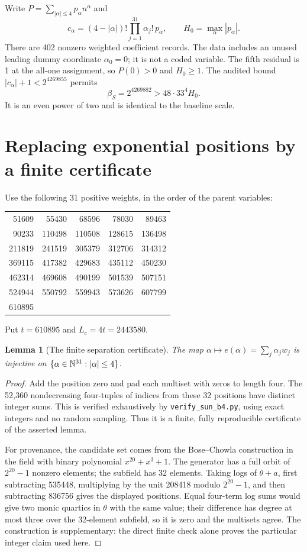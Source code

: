 \documentclass[11pt]{article}
\newtheorem{lemma}[theorem]{Lemma}
\begin{document}
Write $P=\sum_{|\alpha|\le4}p_\alpha n^\alpha$ and
\[
 c_\alpha=(4-|\alpha|)!\prod_{j=1}^{31}\alpha_j!\,p_\alpha,
 \qquad H_0=\max_\alpha|p_\alpha|.
\]
There are 402 nonzero weighted coefficient records. The data includes an
unused leading dummy coordinate $\alpha_0=0$; it is not a coded variable.
The fifth residual is 1 at the all-one assignment, so $P(0)>0$ and $H_0\ge1$.
The audited bound $|c_\alpha|+1<2^{4269855}$ permits
\[
 \beta_S=2^{4269882}>48\cdot33^4H_0.
\]
It is an even power of two and is identical to the baseline scale.

\section{Replacing exponential positions by a finite certificate}
Use the following 31 positive weights, in the order of the parent variables:
\begin{center}\small
\begin{tabular}{rrrrr}
51609&55430&68596&78030&89463\\
90233&110498&110508&128615&136498\\
211819&241519&305379&312706&314312\\
369115&417382&429683&435112&450230\\
462314&469608&490199&501539&507151\\
524944&550792&559943&573626&607799\\
610895&&&&
\end{tabular}
\end{center}
Put $t=610895$ and $L_c=4t=2443580$.

\begin{lemma}[The finite separation certificate]\label{lem:b4}
The map $\alpha\mapsto e(\alpha)=\sum_j\alpha_jw_j$ is injective on
$\{\alpha\in\mathbb N^{31}:|\alpha|\le4\}$.
\end{lemma}
\begin{proof}
Add the position zero and pad each multiset with zeros to length four.
The 52,360 nondecreasing four-tuples of indices from these 32 positions have
distinct integer sums. This is verified exhaustively by
\texttt{verify\_sun\_b4.py}, using exact integers and no random sampling.
Thus it is a finite, fully reproducible certificate of the asserted lemma.

For provenance, the candidate set comes from the Bose--Chowla construction
in the field with binary polynomial $x^{20}+x^3+1$. The generator has a full
orbit of $2^{20}-1$ nonzero elements; the subfield has 32 elements. Taking
logs of $\theta+a$, first subtracting 535448, multiplying by the unit
208418 modulo $2^{20}-1$, and then subtracting 836756 gives the displayed
positions. Equal four-term log
sums would give two monic quartics in $\theta$ with the same value; their
difference has degree at most three over the 32-element subfield, so it is
zero and the multisets agree. The construction is supplementary: the direct
finite check alone proves the particular integer claim used here.
\end{proof}
\end{document}
